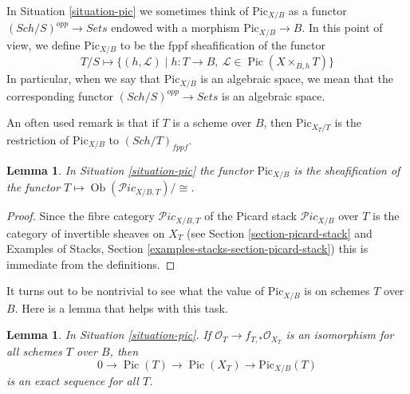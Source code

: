 \documentclass{stacks-project}
\theoremstyle{plain}
\newtheorem{lemma}[subsection]{Lemma}
\theoremstyle{definition}
\theoremstyle{remark}
\numberwithin{equation}{subsection}
\def\Sch{\mathit{Sch}}
\def\Ob{\mathop{\mathrm{Ob}}\nolimits}
\def\Pic{\mathop{\mathrm{Pic}}\nolimits}
\def\Picardstack{\mathcal{P}\!\mathit{ic}}
\def\Picardfunctor{\mathrm{Pic}}
\begin{document}
\noindent
In Situation \ref{situation-pic} we sometimes think of
$\Picardfunctor_{X/B}$ as a functor $(\Sch/S)^{opp} \to \textit{Sets}$
endowed with a morphism $\Picardfunctor_{X/B} \to B$. In this point
of view, we define $\Picardfunctor_{X/B}$ to be the fppf sheafification of
the functor
$$
T/S \longmapsto \{(h, \mathcal{L}) \mid
h : T \to B,\ \mathcal{L} \in \Pic(X \times_{B, h} T)\}
$$
In particular, when we say that $\Picardfunctor_{X/B}$ is an algebraic space,
we mean that the corresponding functor
$(\Sch/S)^{opp} \to \textit{Sets}$ is an algebraic space.

\medskip\noindent
An often used remark is that if $T$ is a scheme over $B$, then
$\Picardfunctor_{X_T/T}$ is the restriction of $\Picardfunctor_{X/B}$ to
$(\Sch/T)_{fppf}$.

\begin{lemma}
\label{lemma-pic-over-pic}
In Situation \ref{situation-pic}
the functor $\Picardfunctor_{X/B}$ is the sheafification of
the functor $T \mapsto \Ob(\Picardstack_{X/B, T})/\cong$.
\end{lemma}

\begin{proof}
Since the fibre category $\Picardstack_{X/B, T}$ of the Picard stack
$\Picardstack_{X/B}$ over $T$ is the category of invertible sheaves on
$X_T$ (see Section \ref{section-picard-stack} and
Examples of Stacks, Section \ref{examples-stacks-section-picard-stack})
this is immediate from the definitions.
\end{proof}

\noindent
It turns out to be nontrivial to see what the value of $\Picardfunctor_{X/B}$
is on schemes $T$ over $B$. Here is a lemma that helps with this task.

\begin{lemma}
\label{lemma-flat-geometrically-connected-fibres}
In Situation \ref{situation-pic}.
If $\mathcal{O}_T \to f_{T, *}\mathcal{O}_{X_T}$ is an isomorphism
for all schemes $T$ over $B$, then
$$
0 \to \Pic(T) \to \Pic(X_T) \to \Picardfunctor_{X/B}(T)
$$
is an exact sequence for all $T$.
\end{lemma}
\end{document}
